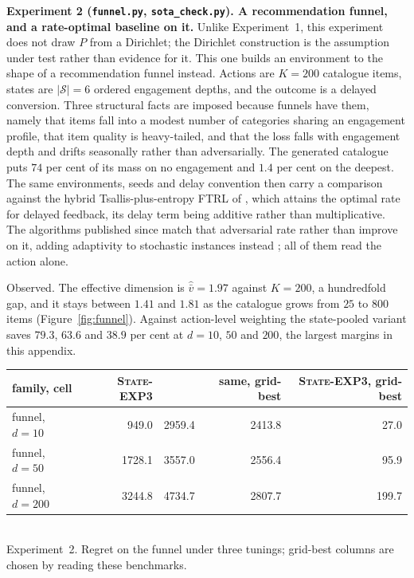 \documentclass{article}
\theoremstyle{remark}
\newcommand{\Sset}{\mathcal{S}}
\newcommand{\vhat}{\widehat{\bar v}}
\begin{document}
\FloatBarrier

\textbf{Experiment 2 (\texttt{funnel.py}, \texttt{sota\_check.py}). A recommendation funnel, and a rate-optimal baseline on it.} Unlike Experiment~1, this
experiment does not draw $P$ from a Dirichlet; the Dirichlet construction is the assumption under
test rather than evidence for it. This
one builds an environment to the shape of a recommendation funnel instead. Actions are $K=200$
catalogue items, states are $|\Sset|=6$ ordered engagement depths, and the outcome is a delayed
conversion. Three structural facts are imposed because funnels have them, namely that items fall
into a modest number of categories sharing an engagement profile, that item quality is
heavy-tailed, and that the loss falls with engagement depth and drifts seasonally rather than
adversarially. The generated catalogue puts $74$ per cent of its mass on no engagement and $1.4$
per cent on the deepest. The same environments, seeds and delay convention then carry a comparison
against the hybrid Tsallis-plus-entropy \textsc{FTRL} of \citet{zimmert2020}, which attains the
optimal rate for delayed feedback, its delay term being additive rather than multiplicative. The
algorithms published since match that adversarial rate rather than improve on it, adding
adaptivity to stochastic instances instead \citep{schlisselberg2025}; all of them read the action
alone.

Observed. The effective dimension is $\vhat=1.97$ against $K=200$, a hundredfold gap, and it stays
between $1.41$ and $1.81$ as the catalogue grows from $25$ to $800$ items
(Figure~\ref{fig:funnel}). Against action-level weighting the state-pooled variant saves $79.3$,
$63.6$ and $38.9$ per cent at $d=10$, $50$ and $200$, the largest margins in this appendix.

\begin{center}\small
\begin{tabular}{@{}lrrrr@{}}
\toprule
family, cell & \textsc{State-EXP3} & \citeauthor{zimmert2020} & same, grid-best & \textsc{State-EXP3}, grid-best \\
\midrule
funnel, $d=10$   &  949.0 & 2959.4 & 2413.8 & 27.0 \\
funnel, $d=50$   & 1728.1 & 3557.0 & 2556.4 & 95.9 \\
funnel, $d=200$  & 3244.8 & 4734.7 & 2807.7 & 199.7 \\
\bottomrule
\end{tabular}\\[2pt]
Experiment~2. Regret on the funnel under three tunings; grid-best columns are chosen by
reading these benchmarks.
\end{center}
\end{document}

